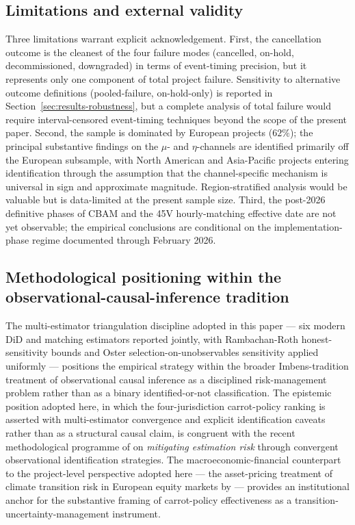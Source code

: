 \documentclass[12pt,a4paper]{article}
\theoremstyle{plain}
\theoremstyle{definition}
\begin{document}
\subsection{Limitations and external validity}
\label{sec:discussion-limitations}

Three limitations warrant explicit acknowledgement. First, the cancellation outcome is the cleanest of the four failure modes (cancelled, on-hold, decommissioned, downgraded) in terms of event-timing precision, but it represents only one component of total project failure. Sensitivity to alternative outcome definitions (pooled-failure, on-hold-only) is reported in Section~\ref{sec:results-robustness}, but a complete analysis of total failure would require interval-censored event-timing techniques beyond the scope of the present paper. Second, the sample is dominated by European projects ($62\%$); the principal substantive findings on the $\mu$- and $\eta$-channels are identified primarily off the European subsample, with North American and Asia-Pacific projects entering identification through the assumption that the channel-specific mechanism is universal in sign and approximate magnitude. Region-stratified analysis would be valuable but is data-limited at the present sample size. Third, the post-2026 definitive phases of CBAM and the 45V hourly-matching effective date are not yet observable; the empirical conclusions are conditional on the implementation-phase regime documented through February 2026.

\subsection{Methodological positioning within the observational-causal-inference tradition}
\label{sec:p2-method-positioning}

The multi-estimator triangulation discipline adopted in this paper --- six modern DiD and matching estimators reported jointly, with Rambachan-Roth honest-sensitivity bounds and Oster selection-on-unobservables sensitivity applied uniformly --- positions the empirical strategy within the broader Imbens-tradition treatment of observational causal inference \cite{imbens2018causal} as a disciplined risk-management problem rather than as a binary identified-or-not classification. The epistemic position adopted here, in which the four-jurisdiction carrot-policy ranking is asserted with multi-estimator convergence and explicit identification caveats rather than as a structural causal claim, is congruent with the recent methodological programme of \cite{blasques2024mitigating} on \emph{mitigating estimation risk} through convergent observational identification strategies. The macroeconomic-financial counterpart to the project-level perspective adopted here --- the asset-pricing treatment of climate transition risk in European equity markets by \citet{loyson2023pricing} --- provides an institutional anchor for the substantive framing of carrot-policy effectiveness as a transition-uncertainty-management instrument.
\end{document}

